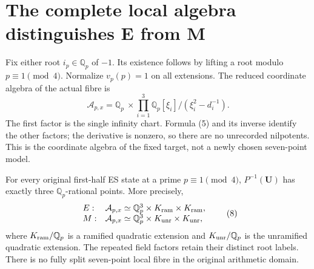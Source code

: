 \section{The complete local algebra distinguishes E from M}
Fix either root $i_p\in\mathbb Q_p$ of $-1$. Its existence follows by lifting
a root modulo $p\equiv1\pmod4$. Normalize $v_p(p)=1$ on all extensions.
The reduced coordinate algebra of the actual fibre is
\[
 \boxed{\mathcal A_{p,x}=\mathbb Q_p\ \times\!
 \prod_{i=1}^3\mathbb Q_p[\xi_i]/(\xi_i^2-d_i^{-1}).}       \tag{7}
\]
The first factor is the single infinity chart. Formula (5) and its inverse
identify the other factors; the derivative is nonzero, so there are no
unrecorded nilpotents. This is the coordinate algebra of the fixed target,
not a newly chosen seven-point model.

\begin{theorem}\label{thm:local}
For every original first-half ES state at a prime $p\equiv1\pmod4$,
$P^{-1}(\mathbf U)$ has exactly three $\mathbb Q_p$-rational points.
More precisely,
\[
 \begin{array}{ll}
 E:&\mathcal A_{p,x}\simeq\mathbb Q_p^3\times K_{\rm ram}\times K_{\rm ram},\\
 M:&\mathcal A_{p,x}\simeq\mathbb Q_p^3\times K_{\rm unr}\times K_{\rm unr},
 \end{array}                                                    \tag{8}
\]
where $K_{\rm ram}/\mathbb Q_p$ is a ramified quadratic extension and
$K_{\rm unr}/\mathbb Q_p$ is the unramified quadratic extension. The repeated
field factors retain their distinct root labels. There is no fully split
seven-point local fibre in the original arithmetic domain.
\end{theorem}
